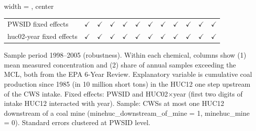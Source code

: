 \begin{table}[htbp]
\begin{adjustbox}{width = \textwidth, center}
\begin{tabular}{lccccccccccc}
          \\
         
         PWSID fixed effects                 & $\checkmark$          & $\checkmark$          & $\checkmark$  & $\checkmark$  & $\checkmark$    & $\checkmark$    & $\checkmark$          & $\checkmark$         & $\checkmark$    & $\checkmark$          & $\checkmark$\\   
         huc02-year fixed effects            & $\checkmark$          & $\checkmark$          & $\checkmark$  & $\checkmark$  & $\checkmark$    & $\checkmark$    & $\checkmark$          & $\checkmark$         & $\checkmark$    & $\checkmark$          & $\checkmark$\\   
         
         \bottomrule
         
      \end{tabular}
      
      
      
   \end{adjustbox}
      {\tiny\linespread{1}\selectfont \par \raggedright 
   Sample period 1998--2005 (robustness). Within each chemical, columns show (1) mean measured concentration and (2) share of annual samples exceeding the MCL, both from the EPA 6-Year Review. Explanatory variable is cumulative coal production since 1985 (in 10 million short tons) in the HUC12 one step upstream of the CWS intake. Fixed effects: PWSID and HUC02$\times$year (first two digits of intake HUC12 interacted with year). Sample: CWSs at most one HUC12 downstream of a coal mine (minehuc\_downstream\_of\_mine = 1, minehuc\_mine = 0). Standard errors clustered at PWSID level.}
   
\end{table}


